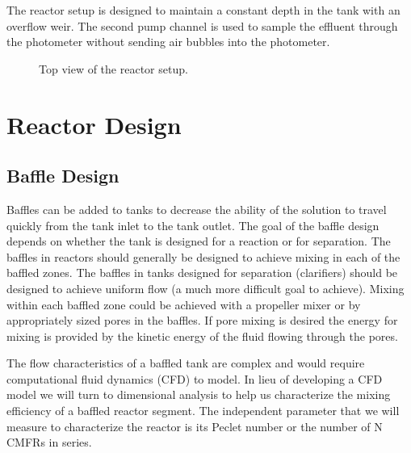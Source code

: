 \documentclass[letterpaper,10pt,english]{sphinxmanual}
\let\sphinxpxdimen\pdfpxdimen\else\newdimen\sphinxpxdimen
\begin{document}
The reactor setup is designed to maintain a constant depth in the tank with an overflow weir. The second pump channel is used to sample the effluent through the photometer without sending air bubbles into the photometer.

\begin{figure}[htbp]
\centering
\capstart

\noindent\sphinxincludegraphics[width=300\sphinxpxdimen]{{Reactor_photo_top}.png}
\caption{Top view of the reactor setup.}\label{\detokenize{Reactor_Characteristics/Reactor_Characteristics:id10}}\label{\detokenize{Reactor_Characteristics/Reactor_Characteristics:figure-reactor-photo-top}}\end{figure}


\section{Reactor Design}
\label{\detokenize{Reactor_Characteristics/Reactor_Characteristics:reactor-design}}\label{\detokenize{Reactor_Characteristics/Reactor_Characteristics:heading-reactor-design}}

\subsection{Baffle Design}
\label{\detokenize{Reactor_Characteristics/Reactor_Characteristics:baffle-design}}
Baffles can be added to tanks to decrease the ability of the solution to travel quickly from the tank inlet to the tank outlet. The goal of the baffle design depends on whether the tank is designed for a reaction or for separation. The baffles in reactors should generally be designed to achieve mixing in each of the baffled zones. The baffles in tanks designed for separation (clarifiers) should be designed to achieve uniform flow (a much more difficult goal to achieve). Mixing within each baffled zone could be achieved with a propeller mixer or by appropriately sized pores in the baffles. If pore mixing is desired the energy for mixing is provided by the kinetic energy of the fluid flowing through the pores.

The flow characteristics of a baffled tank are complex and would require computational fluid dynamics (CFD) to model. In lieu of developing a CFD model we will turn to dimensional analysis to help us characterize the mixing efficiency of a baffled reactor segment. The independent parameter that we will measure to characterize the reactor is its Peclet number or the number of N CMFRs in series.
\end{document}
